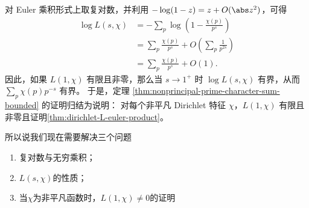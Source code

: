 对 Euler 乘积形式上取复对数，并利用
$-\log(1-z)=z+O(\abs z^2)$，可得
\[
\begin{aligned}
\log L(s,\chi)
&=-\sum_p\log\left(1-\frac{\chi(p)}{p^s}\right)\\
&=\sum_p\frac{\chi(p)}{p^s}
+O\left(\sum_p\frac1{p^{2s}}\right)\\
&=\sum_p\frac{\chi(p)}{p^s}+O(1).
\end{aligned}
\]
因此，如果 $L(1,\chi)$ 有限且非零，那么当 $s\to1^+$ 时
$\log L(s,\chi)$ 有界，从而 $\sum_p\chi(p)p^{-s}$ 有界。
于是，定理
\ref{thm:nonprincipal-prime-character-sum-bounded} 的证明归结为说明：
对每个非平凡 Dirichlet 特征 $\chi$，$L(1,\chi)$ 有限且非零且证明\ref{thm:dirichlet-L-euler-product}。

所以说我们现在需要解决三个问题
\begin{enumerate}
	\item 复对数与无穷乘积；
	\item $L(s,\chi)$的性质；
	\item 当$\chi$为非平凡函数时，$L(1,\chi)\neq 0$的证明
\end{enumerate}

